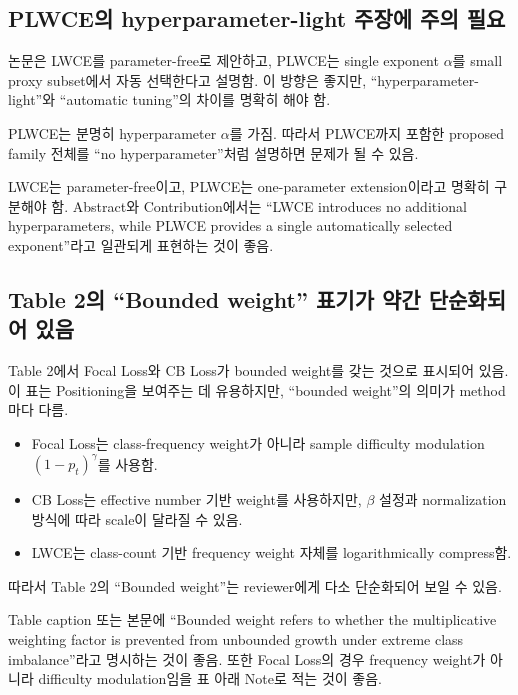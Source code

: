 \documentclass[11pt,a4paper]{article}
\begin{document}
\subsection{PLWCE의 hyperparameter-light 주장에 주의 필요}

논문은 LWCE를 parameter-free로 제안하고, PLWCE는 single exponent \(\alpha\)를 small proxy subset에서 자동 선택한다고 설명함. 이 방향은 좋지만, ``hyperparameter-light''와 ``automatic tuning''의 차이를 명확히 해야 함.

PLWCE는 분명히 hyperparameter \(\alpha\)를 가짐. 따라서 PLWCE까지 포함한 proposed family 전체를 ``no hyperparameter''처럼 설명하면 문제가 될 수 있음.

\begin{tcolorbox}[title=수정 권장]
LWCE는 parameter-free이고, PLWCE는 one-parameter extension이라고 명확히 구분해야 함. Abstract와 Contribution에서는 ``LWCE introduces no additional hyperparameters, while PLWCE provides a single automatically selected exponent''라고 일관되게 표현하는 것이 좋음.
\end{tcolorbox}

\subsection{Table 2의 ``Bounded weight'' 표기가 약간 단순화되어 있음}

Table 2에서 Focal Loss와 CB Loss가 bounded weight를 갖는 것으로 표시되어 있음. 이 표는 Positioning을 보여주는 데 유용하지만, ``bounded weight''의 의미가 method마다 다름.

\begin{itemize}
\item Focal Loss는 class-frequency weight가 아니라 sample difficulty modulation \((1-p_t)^\gamma\)를 사용함.
\item CB Loss는 effective number 기반 weight를 사용하지만, \(\beta\) 설정과 normalization 방식에 따라 scale이 달라질 수 있음.
\item LWCE는 class-count 기반 frequency weight 자체를 logarithmically compress함.
\end{itemize}

따라서 Table 2의 ``Bounded weight''는 reviewer에게 다소 단순화되어 보일 수 있음.

\begin{tcolorbox}[title=수정 권장]
Table caption 또는 본문에 ``Bounded weight refers to whether the multiplicative weighting factor is prevented from unbounded growth under extreme class imbalance''라고 명시하는 것이 좋음. 또한 Focal Loss의 경우 frequency weight가 아니라 difficulty modulation임을 표 아래 Note로 적는 것이 좋음.
\end{tcolorbox}
\end{document}
